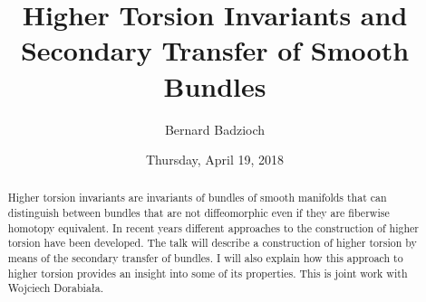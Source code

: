 \documentclass{UAmathtalk}
\author{Bernard Badzioch}
\title{Higher Torsion Invariants and\\ Secondary Transfer of Smooth Bundles}
\date{Thursday, April 19, 2018}
\begin{document}
\maketitle

\begin{abstract}
Higher torsion invariants are invariants of bundles of smooth manifolds that can distinguish between bundles that are not diffeomorphic even if they are fiberwise homotopy equivalent. In recent years different approaches to the construction of higher torsion have been developed. The talk will describe a construction of higher torsion by means of the secondary transfer of bundles. I will also explain how this approach to higher torsion provides an insight into some of its properties. This is joint work with Wojciech Dorabiała.
\end{abstract}
\end{document}

